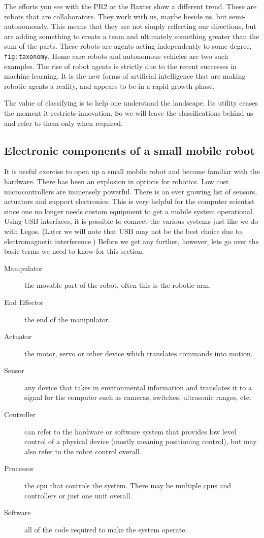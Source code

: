 The efforts you see with the PR2 or the Baxter show a different trend.
These are robots that are collaborators. They work with us, maybe beside
us, but semi-autonomously. This means that they are not simply
reflecting our directions, but are adding something to create a team and
ultimately something greater than the sum of the parts. These robots are
agents acting independently to some degree, \texttt{fig:taxonomy}. Home
care robots and autonomous vehicles are two such examples. The rise of
robot agents is strictly due to the recent successes in machine
learning. It is the new forms of artificial intelligence that are making
robotic agents a reality, and appears to be in a rapid growth phase.

The value of classifying is to help one understand the landscape. Its
utility ceases the moment it restricts innovation. So we will leave the
classifications behind us and refer to them only when required.

\hypertarget{electronic-components-of-a-small-mobile-robot}{%
\subsection{Electronic components of a small mobile
robot}\label{electronic-components-of-a-small-mobile-robot}}

It is useful exercise to open up a small mobile robot and become
familiar with the hardware. There has been an explosion in options for
robotics. Low cost microcontrollers are immensely powerful. There is an
ever growing list of sensors, actuators and support electronics. This is
very helpful for the computer scientist since one no longer needs custom
equipment to get a mobile system operational. Using USB interfaces, it
is possible to connect the various systems just like we do with Legos.
(Later we will note that USB may not be the best choice due to
electromagnetic interference.) Before we get any further, however, lets
go over the basic terms we need to know for this section.

\begin{description}
\item[Manipulator]
the movable part of the robot, often this is the robotic arm.
\item[End Effector]
the end of the manipulator.
\item[Actuator]
the motor, servo or other device which translates commands into motion.
\item[Sensor]
any device that takes in environmental information and translates it to
a signal for the computer such as cameras, switches, ultrasonic ranges,
etc.
\item[Controller]
can refer to the hardware or software system that provides low level
control of a physical device (mostly meaning positioning control), but
may also refer to the robot control overall.
\item[Processor]
the cpu that controls the system. There may be multiple cpus and
controllers or just one unit overall.
\item[Software]
all of the code required to make the system operate.
\end{description}

